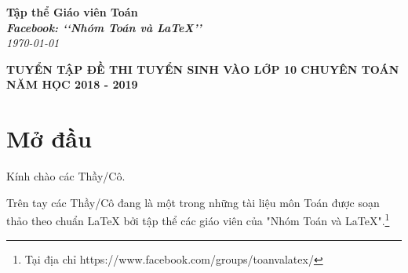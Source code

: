 \documentclass[12pt,a4paper,oneside]{book}
\renewcommand{\baselinestretch}{1.4}
\theoremstyle{nonumberplain}
\numberwithin{equation}{section}
\renewcommand{\baselinestretch}{1.4}
\begin{document}
\providecommand*{\dx}{\ensuremath{\mathrm{\,d}}x}
\providecommand*{\unit}[1]{\ensuremath{\mathrm{\,#1}}}

\begin{titlepage}
\begin{flushright}
\fontsize{17}{0}\selectfont
\textbf{Tập thể Giáo viên Toán}\\
\textbf{\textit{Facebook: \lq\lq Nhóm Toán và LaTeX\rq\rq}}\\
\textit{\color{red}\today}
\end{flushright}

\vspace{4cm}

\begin{flushright}

\vspace{1cm}

 \textbf{\fontsize{20}{0}\selectfont T\fontsize{15}{0}\selectfont UYỂN TẬP ĐỀ THI TUYỂN SINH VÀO LỚP 10 CHUYÊN TOÁN NĂM HỌC 2018 - 2019}
 
 
\end{flushright}

\end{titlepage}
\pagestyle{empty}
\renewcommand{\headrulewidth}{0.4pt}

{\renewcommand{\baselinestretch}{1.3}
\tableofcontents
}

\pagestyle{fancy}
\lhead{\empty}
\rhead{\empty}
\lfoot{\currfilename}
\chapter*{Mở đầu}
Kính chào các Thầy/Cô.

\vspace{0.6cm}

\noindent Trên tay các Thầy/Cô đang là một trong những tài liệu môn Toán được soạn thảo theo chuẩn \LaTeX{} bởi tập thể các giáo viên của "Nhóm Toán và LaTeX".\footnote{Tại địa chỉ https://www.facebook.com/groups/toanvalatex/}

\vspace{0.6cm}
\end{document}
